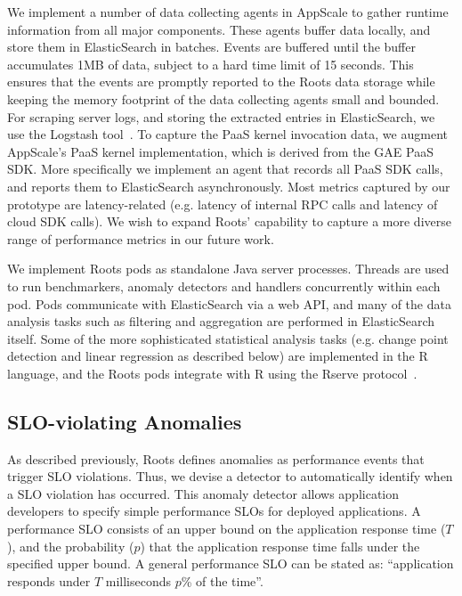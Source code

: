 We implement a number of data collecting agents in AppScale to gather runtime information
from all major components. These agents buffer data locally, and store them in ElasticSearch
in batches. Events are buffered until the buffer accumulates 1MB of data, subject to a hard time limit of 
15 seconds. This ensures that the events are promptly reported to the Roots data
storage while keeping the memory footprint of the data collecting agents small and bounded. 
For scraping server logs, and storing the extracted entries in ElasticSearch,
we use the Logstash tool~\cite{logstash}. 
To capture the PaaS kernel invocation data, we augment AppScale's PaaS kernel implementation,
which is derived from the GAE PaaS SDK. More specifically we implement an agent that records
all PaaS SDK calls, and reports them to ElasticSearch asynchronously. Most metrics captured by
our prototype are latency-related (e.g. latency of internal RPC calls and latency of cloud SDK calls).
We wish to expand Roots' capability to capture a more diverse range of performance metrics in our future
work.

We implement Roots pods as standalone Java server processes. Threads are used to run benchmarkers,
anomaly detectors and handlers concurrently within each pod. Pods communicate with ElasticSearch via
a web API, and many of the data analysis tasks such as filtering and aggregation are performed
in ElasticSearch itself. 
Some of the more sophisticated statistical analysis tasks (e.g. change point detection and 
linear regression as described below) are implemented in the R
language, and the Roots pods integrate with R using the Rserve protocol~\cite{Urbanek03rserve--}.

\subsection{SLO-violating Anomalies}

As described previously,
Roots defines anomalies as performance events that trigger SLO
violations. Thus, we devise a detector to automatically identify when a SLO
violation has occurred. This anomaly detector
allows application developers to specify simple performance SLOs for deployed applications. A
performance SLO consists of an upper bound on the application response time ($T$), and the probability ($p$)
that the application response time falls under the specified upper bound. 
A general performance 
SLO can be stated as: ``application responds under $T$ milliseconds $p$\% of the time''.

